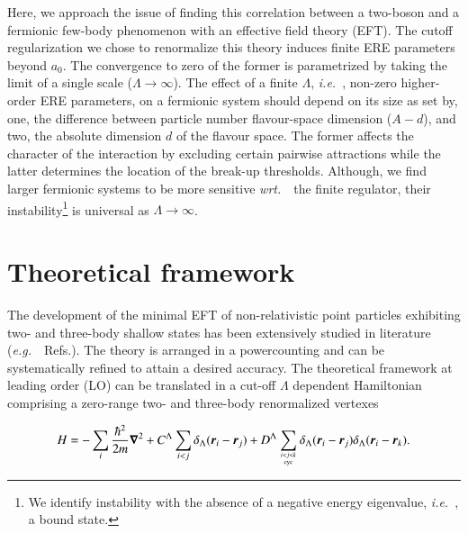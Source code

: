 \documentclass[preprint,12pt]{elsarticle}
\newcommand{\lec}{C^\Lambda}
\newcommand{\led}{D^\Lambda}
\newcommand{\wrt}{\textit{wrt.}~}
\newcommand{\eg}{\textit{e.g.}~}
\newcommand{\ie}{\textit{i.e.}~}
\newcommand{\ve}[1]{\ensuremath{\boldsymbol{#1}}}
\begin{document}
Here, we approach the issue of finding this correlation between a two-boson and a fermionic
few-body phenomenon with an effective field theory (EFT). The cutoff regularization we chose to
renormalize this theory induces finite ERE parameters beyond $a_0$. The convergence to zero of the former
is parametrized by taking the limit of a single scale ($\Lambda\to\infty$). The effect of a finite $\Lambda$, \ie,
non-zero higher-order ERE parameters, on a fermionic system should depend on its size as set by, one, the difference
between particle number flavour-space dimension ($A-d$), and two, the absolute dimension $d$ of the flavour space.
The former affects the character of the interaction by excluding certain pairwise attractions while the
latter determines the location of the break-up thresholds. Although, we find larger fermionic systems to
be more sensitive \wrt~the finite regulator, their instability\footnote{We identify instability with the
absence of a negative energy eigenvalue, \ie, a bound state.} is universal as $\Lambda\to\infty$.

\section{Theoretical framework}

The development of the minimal EFT of non-relativistic point particles exhibiting two- and three-body shallow states has been extensively studied in literature (\eg~Refs.\cite{Lepage:1997cs,vanKolck:1999mw, Bedaque:1998kg, Braaten:2004rn, Hammer:2017tjm, Hammer:2019poc}).
The theory is arranged in a powercounting and can be systematically refined to attain a desired accuracy.
The theoretical framework at leading order (LO) can be translated in a cut-off $\Lambda$ dependent Hamiltonian comprising a zero-range two- and three-body renormalized vertexes

\begin{equation}
H = - \sum_i \frac{\hbar^2}{2m}\ve{\nabla}^2+ \lec \sum_{i<j}{\delta_\Lambda(\ve{r}_i-\ve{r}_j)} 
+ \led \sum_{ i<j<k \atop \text{cyc} }\delta_\Lambda(\ve{r}_i-\ve{r}_j)\delta_\Lambda(\ve{r}_i-\ve{r}_k).
\label{eq:hamiltonian}
\end{equation}
\end{document}
